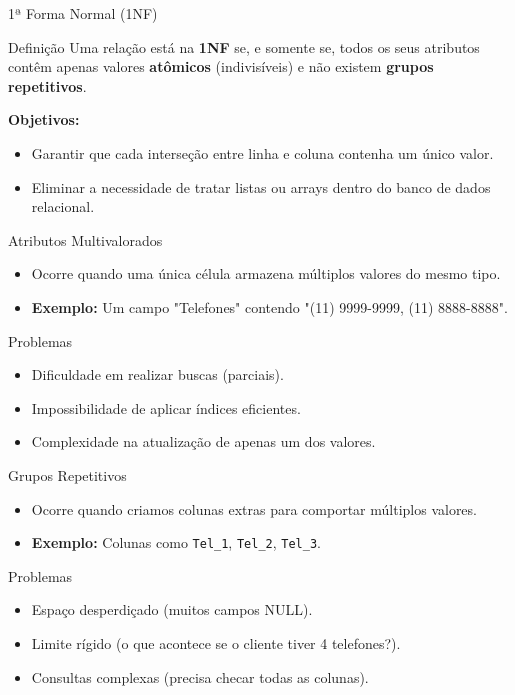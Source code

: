 \documentclass[9pt]{beamer}
\begin{document}
\begin{frame}{1ª Forma Normal (1NF)}
  \begin{block}{Definição}
    Uma relação está na \textbf{1NF} se, e somente se, todos os seus atributos contêm apenas valores \textbf{atômicos} (indivisíveis) e não existem \textbf{grupos repetitivos}.
  \end{block}
  \vspace{0.3cm}
  \textbf{Objetivos:}
  \begin{itemize}
    \item Garantir que cada interseção entre linha e coluna contenha um único valor.
    \item Eliminar a necessidade de tratar listas ou arrays dentro do banco de dados relacional.
  \end{itemize}
\end{frame}

\begin{frame}{Atributos Multivalorados}
  \begin{itemize}
    \item Ocorre quando uma única célula armazena múltiplos valores do mesmo tipo.
    \item \textbf{Exemplo:} Um campo "Telefones" contendo "(11) 9999-9999, (11) 8888-8888".
  \end{itemize}
  \vspace{0.3cm}
  \begin{alertblock}{Problemas}
    \begin{itemize}
      \item Dificuldade em realizar buscas (parciais).
      \item Impossibilidade de aplicar índices eficientes.
      \item Complexidade na atualização de apenas um dos valores.
    \end{itemize}
  \end{alertblock}
\end{frame}

\begin{frame}{Grupos Repetitivos}
  \begin{itemize}
    \item Ocorre quando criamos colunas extras para comportar múltiplos valores.
    \item \textbf{Exemplo:} Colunas como \texttt{Tel\_1}, \texttt{Tel\_2}, \texttt{Tel\_3}.
  \end{itemize}
  \vspace{0.3cm}
  \begin{alertblock}{Problemas}
    \begin{itemize}
      \item Espaço desperdiçado (muitos campos NULL).
      \item Limite rígido (o que acontece se o cliente tiver 4 telefones?).
      \item Consultas complexas (precisa checar todas as colunas).
    \end{itemize}
  \end{alertblock}
\end{frame}
\end{document}
